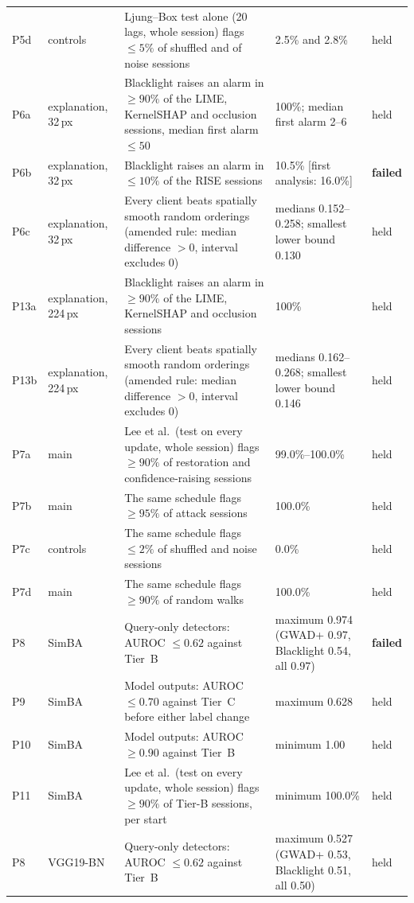 \begin{footnotesize}
\begin{longtable}{L{0.9cm}L{1.9cm}L{5.0cm}L{3.4cm}L{1.1cm}}
P5d & controls & Ljung--Box test alone (20 lags, whole session) flags $\le5\%$ of shuffled and of noise sessions & 2.5\% and 2.8\% & held \\
P6a & explanation, 32\,px & Blacklight raises an alarm in $\ge90\%$ of the LIME, KernelSHAP and occlusion sessions, median first alarm $\le50$ & 100\%; median first alarm 2--6 & held \\
P6b & explanation, 32\,px & Blacklight raises an alarm in $\le10\%$ of the RISE sessions & 10.5\% [first analysis: 16.0\%] & \textbf{failed} \\
P6c & explanation, 32\,px & Every client beats spatially smooth random orderings (amended rule: median difference $>0$, interval excludes 0) & medians 0.152--0.258; smallest lower bound 0.130 & held \\
P13a & explanation, 224\,px & Blacklight raises an alarm in $\ge90\%$ of the LIME, KernelSHAP and occlusion sessions & 100\% & held \\
P13b & explanation, 224\,px & Every client beats spatially smooth random orderings (amended rule: median difference $>0$, interval excludes 0) & medians 0.162--0.268; smallest lower bound 0.146 & held \\
P7a & main & Lee et al.\ (test on every update, whole session) flags $\ge90\%$ of restoration and confidence-raising sessions & 99.0\%--100.0\% & held \\
P7b & main & The same schedule flags $\ge95\%$ of attack sessions & 100.0\% & held \\
P7c & controls & The same schedule flags $\le2\%$ of shuffled and noise sessions & 0.0\% & held \\
P7d & main & The same schedule flags $\ge90\%$ of random walks & 100.0\% & held \\
P8 & SimBA & Query-only detectors: AUROC $\le0.62$ against Tier~B & maximum 0.974 (GWAD+ 0.97, Blacklight 0.54, all 0.97) & \textbf{failed} \\
P9 & SimBA & Model outputs: AUROC $\le0.70$ against Tier~C before either label change & maximum 0.628 & held \\
P10 & SimBA & Model outputs: AUROC $\ge0.90$ against Tier~B & minimum 1.00 & held \\
P11 & SimBA & Lee et al.\ (test on every update, whole session) flags $\ge90\%$ of Tier-B sessions, per start & minimum 100.0\% & held \\
P8 & VGG19-BN & Query-only detectors: AUROC $\le0.62$ against Tier~B & maximum 0.527 (GWAD+ 0.53, Blacklight 0.51, all 0.50) & held \\

\end{longtable}
\end{footnotesize}
